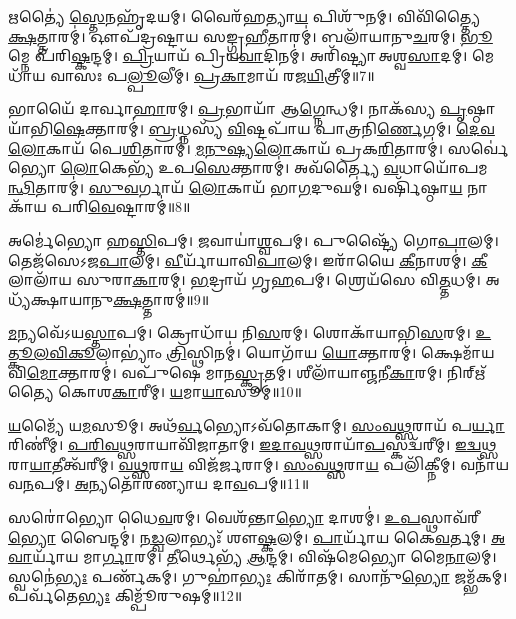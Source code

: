 𑌋𑌤𑍍𑌯𑍈॑ \ul{𑌸𑍍𑌤𑍇}\-𑌨𑌹𑍃᳴𑌦𑌯𑌮𑍍।
𑌵𑍈𑌰᳴𑌹𑌤𑍍𑌯𑌾\-\ul{𑌯} 𑌪𑌿𑌶𑍁᳴𑌨𑌮𑍍।
𑌵𑌿𑌵𑌿᳴𑌤𑍍𑌤𑍍𑌯𑍈 \ul{𑌕𑍍𑌷}\-𑌤𑍍𑌤𑌾𑌰𑌮𑍍॑।
𑌔𑌪᳴𑌦𑍍𑌰𑌷𑍍𑌟𑌾𑌯 𑌸𑌙𑍍𑌗𑍍𑌰\-\ul{𑌹𑍀}\-𑌤𑌾𑌰𑌮𑍍॑।
𑌬𑌲𑌾᳴𑌯𑌾𑌨𑍁\-\ul{𑌚}\-𑌰𑌮𑍍।
\-\ul{𑌭𑍂}\-𑌮𑍍𑌨𑍇 𑌪᳴𑌰𑌿\-\ul{𑌷𑍍𑌕}\-𑌨𑍍𑌦𑌮𑍍।
\-\ul{𑌪𑍍𑌰𑌿}\-𑌯𑌾𑌯᳴ 𑌪𑍍𑌰𑌿𑌯\-\ul{𑌵𑌾}\-𑌦𑌿𑌨𑌮𑍍॑।
𑌅𑌰𑌿᳴𑌷𑍍𑌟𑍍𑌯𑌾 𑌅𑌶𑍍𑌵\-\ul{𑌸𑌾}\-𑌦𑌮𑍍।
𑌮𑍇𑌧𑌾᳴𑌯 𑌵𑌾𑌸𑌃 𑌪\-\ul{𑌲𑍍𑌪𑍂}\-𑌲𑍀𑌮𑍍।
\-\ul{𑌪𑍍𑌰}\-\-\ul{𑌕𑌾}\-𑌮𑌾𑌯᳴ 𑌰𑌜\-\ul{𑌯𑌿}\-𑌤𑍍𑌰𑍀𑌮𑍍॥7॥

𑌭𑌾𑌯𑍈᳴ 𑌦𑌾𑌰𑍍𑌵𑌾\-\ul{𑌹𑌾}\-𑌰𑌮𑍍।
\-\ul{𑌪𑍍𑌰}\-𑌭𑌾𑌯𑌾᳴ 𑌆\-\ul{𑌗𑍍𑌨𑍇}\-𑌨𑍍𑌧𑌮𑍍।
𑌨𑌾𑌕᳴𑌸𑍍𑌯 \ul{𑌪𑍃}\-𑌷𑍍𑌠𑌾𑌯𑌾᳴𑌭𑌿\-\-\ul{𑌷𑍇}\-𑌕𑍍𑌤𑌾𑌰𑌮𑍍॑।
\-\ul{𑌬𑍍𑌰}\-𑌧𑍍𑌨𑌸𑍍𑌯᳴ \ul{𑌵𑌿}\-𑌷𑍍𑌟𑌪𑌾᳴𑌯 𑌪𑌾𑌤𑍍𑌰𑌨𑌿\-\ul{𑌰𑍍𑌣𑍇}\-𑌗𑌮𑍍।
\-\ul{𑌦𑍇}\-\-\ul{𑌵}\-\-\ul{𑌲𑍋}\-𑌕𑌾𑌯᳴ 𑌪𑍇\-\ul{𑌶𑌿}\-𑌤𑌾𑌰𑌮𑍍॑।
\-\ul{𑌮}\-\-\ul{𑌨𑍁}\-\-\ul{𑌷𑍍𑌯}\-\-\ul{𑌲𑍋}\-𑌕𑌾𑌯᳴ 𑌪𑍍𑌰𑌕\-\ul{𑌰𑌿}\-𑌤𑌾𑌰𑌮𑍍॑।
𑌸𑌰𑍍𑌵𑍇॑𑌭𑍍𑌯𑍋 \ul{𑌲𑍋}\-𑌕𑍇𑌭𑍍𑌯᳴ 𑌉𑌪\-\ul{𑌸𑍇}\-𑌕𑍍𑌤𑌾𑌰𑌮𑍍॑।
𑌅𑌵᳴𑌰𑍍𑌤𑍍𑌯𑍈 \ul{𑌵}\-𑌧𑌾𑌯𑍋᳴𑌪𑌮\-\ul{𑌨𑍍𑌥𑌿}\-𑌤𑌾𑌰𑌮𑍍॑।
\-\ul{𑌸𑍁}\-\-\ul{𑌵}\-𑌰𑍍𑌗𑌾𑌯᳴ \ul{𑌲𑍋}\-𑌕𑌾𑌯᳴ 𑌭𑌾\-\ul{𑌗}\-𑌦𑍁𑌘𑌮𑍍॑।
𑌵𑌰𑍍\mbox{}𑌷𑌿᳴𑌷𑍍𑌠𑌾\-\ul{𑌯} 𑌨𑌾𑌕𑌾᳴𑌯 𑌪𑌰𑌿\-\ul{𑌵𑍇}\-𑌷𑍍𑌟𑌾𑌰𑌮𑍍॑॥8॥

𑌅𑌰𑍍𑌮𑍇॑𑌭𑍍𑌯𑍋 𑌹\-\ul{𑌸𑍍𑌤𑌿}\-𑌪𑌮𑍍।
\-\ul{𑌜}\-𑌵𑌾𑌯𑌾॑\-\ul{𑌶𑍍𑌵}\-𑌪𑌮𑍍।
𑌪𑍁𑌷𑍍𑌟𑍍𑌯𑍈᳴ 𑌗𑍋\-\ul{𑌪𑌾}\-𑌲𑌮𑍍।
𑌤𑍇𑌜᳴𑌸𑍇\-𑌽𑌜\-\ul{𑌪𑌾}\-𑌲𑌮𑍍।
\-\ul{𑌵𑍀}\-𑌰𑍍𑌯𑌾᳴𑌯𑌾𑌵𑌿\-\ul{𑌪𑌾}\-𑌲𑌮𑍍।
𑌇𑌰𑌾᳴𑌯𑍈 \ul{𑌕𑍀}\-𑌨𑌾𑌶𑌮𑍍॑।
\-\ul{𑌕𑍀}\-𑌲𑌾𑌲𑌾᳴𑌯 𑌸𑍁𑌰𑌾\-\ul{𑌕𑌾}\-𑌰𑌮𑍍।
\-\ul{𑌭}\-𑌦𑍍𑌰𑌾𑌯᳴ 𑌗𑍃\-\ul{𑌹}\-𑌪𑌮𑍍।
𑌶𑍍𑌰𑍇𑌯᳴𑌸𑍇 𑌵𑌿\-\ul{𑌤𑍍𑌤}\-𑌧𑌮𑍍।
𑌅𑌧𑍍𑌯᳴𑌕𑍍𑌷𑌾𑌯𑌾𑌨𑍁\-\ul{𑌕𑍍𑌷}\-𑌤𑍍𑌤𑌾𑌰𑌮𑍍॑॥9॥

\-\ul{𑌮}\-𑌨𑍍𑌯𑌵𑍇᳴\-𑌽𑌯\-\ul{𑌸𑍍𑌤𑌾}\-𑌪𑌮𑍍।
𑌕𑍍𑌰𑍋𑌧𑌾᳴𑌯 𑌨𑌿\-\ul{𑌸}\-𑌰𑌮𑍍।
𑌶𑍋𑌕𑌾᳴𑌯𑌾𑌭𑌿\-\ul{𑌸}\-𑌰𑌮𑍍।
\-\ul{𑌉}\-\-\ul{𑌤𑍍𑌕𑍂}\-\-\ul{𑌲}\-\-\ul{𑌵𑌿}\-\-\ul{𑌕𑍂}\-𑌲𑌾𑌭𑍍𑌯𑌾𑌂॑ \ul{𑌤𑍍𑌰𑌿}\-𑌸𑍍𑌥𑌿𑌨𑌮𑍍॑।
𑌯𑍋𑌗𑌾᳴𑌯 \ul{𑌯𑍋}\-𑌕𑍍𑌤𑌾𑌰𑌮𑍍॑।
𑌕𑍍𑌷𑍇𑌮𑌾᳴𑌯 𑌵𑌿\-\ul{𑌮𑍋}\-𑌕𑍍𑌤𑌾𑌰𑌮𑍍॑।
𑌵𑌪𑍁᳴𑌷𑍇 𑌮𑌾𑌨\-\ul{𑌸𑍍𑌕𑍃}\-𑌤𑌮𑍍।
𑌶𑍀𑌲𑌾᳴𑌯𑌾𑌞𑍍𑌜𑌨𑍀\-\ul{𑌕𑌾}\-𑌰𑌮𑍍।
𑌨𑌿𑌰𑍍\mbox{}𑌋᳴𑌤𑍍𑌯𑍈 𑌕𑍋𑌶\-\ul{𑌕𑌾}\-𑌰𑍀𑌮𑍍।
\-\ul{𑌯}\-𑌮𑌾\-\ul{𑌯𑌾}\-𑌸𑍂𑌮𑍍॥10॥

\-\ul{𑌯}\-𑌮𑍍𑌯𑍈᳴ 𑌯\-\ul{𑌮}\-𑌸𑍂𑌮𑍍।
𑌅𑌥᳴\-\ul{𑌰𑍍𑌵}\-𑌭𑍍𑌯𑍋\-𑌽𑌵᳴𑌤𑍋𑌕𑌾𑌮𑍍।
\-\ul{𑌸𑌂}\-\-\ul{𑌵}\-\-\ul{𑌥𑍍𑌸}\-𑌰𑌾𑌯᳴ 𑌪\-\ul{𑌰𑍍𑌯𑌾}\-𑌰𑌿𑌣𑍀॑𑌮𑍍।
\-\ul{𑌪}\-\-\ul{𑌰𑌿}\-\-\ul{𑌵}\-\-\ul{𑌥𑍍𑌸}\-𑌰𑌾𑌯𑌾\-𑌵𑌿᳴𑌜𑌾𑌤𑌾𑌮𑍍।
\-\ul{𑌇}\-\-\ul{𑌦𑌾}\-\-\ul{𑌵}\-\-\ul{𑌥𑍍𑌸}\-𑌰𑌾𑌯𑌾᳴\-\ul{𑌪}\-\-𑌸𑍍𑌕𑌦𑍍𑌵᳴𑌰𑍀𑌮𑍍।
\-\ul{𑌇}\-\-\ul{𑌦𑍍𑌵}\-\-\ul{𑌥𑍍𑌸}\-𑌰𑌾\-\ul{𑌯𑌾}\-𑌤𑍀𑌤𑍍𑌵᳴𑌰𑍀𑌮𑍍।
\-\ul{𑌵}\-\-\ul{𑌥𑍍𑌸}\-𑌰𑌾\-\ul{𑌯} 𑌵𑌿𑌜᳴𑌰𑍍𑌜𑌰𑌾𑌮𑍍।
\-\ul{𑌸𑌂}\-\-\ul{𑌵}\-\-\ul{𑌥𑍍𑌸}\-𑌰𑌾\-\ul{𑌯} 𑌪𑌲𑌿᳴𑌕𑍍𑌨𑍀𑌮𑍍।
𑌵𑌨𑌾᳴𑌯 𑌵\-\ul{𑌨}\-𑌪𑌮𑍍।
\-\ul{𑌅}\-𑌨𑍍𑌯𑌤𑍋᳴𑌰𑌣𑍍𑌯𑌾𑌯 𑌦𑌾\-\ul{𑌵}\-𑌪𑌮𑍍॥11॥

𑌸𑌰𑍋॑𑌭𑍍𑌯𑍋 𑌧𑍈\-\ul{𑌵}\-𑌰𑌮𑍍।
𑌵𑍇𑌶᳴𑌨𑍍𑌤𑌾\-\ul{𑌭𑍍𑌯𑍋} 𑌦𑌾𑌶𑌮𑍍॑।
\-\ul{𑌉}\-\-\ul{𑌪}\-𑌸𑍍𑌥𑌾𑌵᳴𑌰𑍀\-\ul{𑌭𑍍𑌯𑍋} 𑌬𑍈𑌨𑍍𑌦𑌮𑍍॑।
\-\ul{𑌨}\-\-\ul{𑌡𑍍𑌵}\-𑌲𑌾𑌭𑍍𑌯𑌃᳴ 𑌶𑍗\-\ul{𑌷𑍍𑌕}\-𑌲𑌮𑍍।
\-\ul{𑌪𑌾}\-𑌰𑍍𑌯𑌾᳴𑌯 𑌕𑍈\-\ul{𑌵}\-𑌰𑍍𑌤𑌮𑍍।
\-\ul{𑌅}\-\-\ul{𑌵𑌾}\-𑌰𑍍𑌯𑌾᳴𑌯 𑌮𑌾\-\ul{𑌰𑍍𑌗𑌾}\-𑌰𑌮𑍍।
\-\ul{𑌤𑍀}\-𑌰𑍍𑌥𑍇𑌭𑍍𑌯᳴ \ul{𑌆}\-𑌨𑍍𑌦𑌮𑍍।
𑌵𑌿𑌷᳴𑌮𑍇𑌭𑍍𑌯𑍋 𑌮𑍈\-\ul{𑌨𑌾}\-𑌲𑌮𑍍।
𑌸𑍍𑌵𑌨𑍇॑\-\ul{𑌭𑍍𑌯𑌃} 𑌪𑌰𑍍𑌣᳴𑌕𑌮𑍍।
𑌗𑍁𑌹𑌾॑\-\ul{𑌭𑍍𑌯𑌃} 𑌕𑌿𑌰𑌾᳴𑌤𑌮𑍍।
𑌸𑌾𑌨𑍁᳴\-\ul{𑌭𑍍𑌯𑍋} 𑌜𑌮𑍍𑌭᳴𑌕𑌮𑍍।
𑌪𑌰𑍍𑌵᳴𑌤𑍇\-\ul{𑌭𑍍𑌯𑌃} 𑌕𑌿𑌮𑍍𑌪𑍂᳴𑌰𑍁𑌷𑌮𑍍॥12॥

